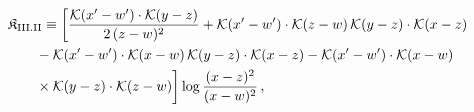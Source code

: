 \begingroup\small
\begin{align}\label{eq:K-rm_III_II}
&\mathfrak{K}_{\rm III.II}\equiv \bigg[\frac{\mathcal{K}(x'-w')\cdot\mathcal{K}(y-z)}{2\,(z-w)^{2}} +\mathcal{K}(x'-w')\cdot\mathcal{K}(z-w)\, \mathcal{K}(y-z)\cdot\mathcal{K}(x-z)\notag\\
&\quad\quad -\mathcal{K}(x'-w')\cdot\mathcal{K}(x-w)\, \mathcal{K}(y-z)\cdot\mathcal{K}(x-z) -\mathcal{K}(x'-w')\cdot\mathcal{K}(x-w)\notag\\
&\quad\quad \times \mathcal{K}(y-z)\cdot\mathcal{K}(z-w)\bigg]\log\frac{(x-z)^{2}}{(x-w)^{2}}\,,
\end{align}
\endgroup
